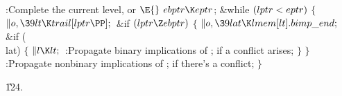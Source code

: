 \B{}:Complete the current level, or \X${}\E{}$\6
$\\{ebptr}\K\\{eptr}{}$;\6
\&{while} ${}(\\{lptr}<\\{eptr}){}$\5
${}\{{}$\1\6
${}\|o,\39\\{lt}\K\\{trail}[\\{lptr}\PP];{}$\6
\&{if} ${}(\\{lptr}\Z\\{ebptr}){}$\5
${}\{{}$\1\6
${}\|o,\39\\{lat}\K\\{lmem}[\\{lt}].\\{bimp\_end};{}$\6
\&{if} (\\{lat})\5
${}\{{}$\1\6
${}\|l\K\\{lt};{}$\6
:Propagate binary implications of ;  if a
conflict arises\X;\6
\4${}\}{}$\2\6
\4${}\}{}$\2\6
:Propagate nonbinary implications of ; 
if there's a conflict\X;\6
\4${}\}{}$\2\par
\U124.\fi

